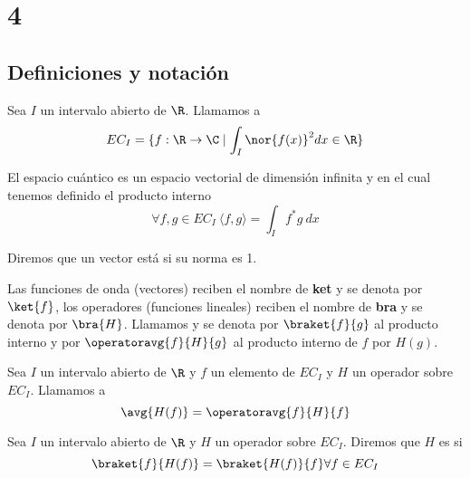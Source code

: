 \chapter{4}\label{ch:4}
\section{Definiciones y notación}
\begin{definition}
    Sea $I$ un intervalo abierto de $\R$. Llamamos  a
    \begin{equation}
        EC_I=\{f:\R\rightarrow\C\mid\int_I\nor{f(x)}^2 dx \in \R\}
    \end{equation}
\end{definition}

El espacio cuántico es un espacio vectorial de dimensión infinita y en el cual tenemos definido el producto interno
\begin{equation}
    \forall f,g\in EC_I \ \langle f,g \rangle=\int_I f^* g\ dx
\end{equation}

\begin{definition}
    Diremos que un vector está  si su norma es 1.
\end{definition}

Las funciones de onda (vectores) reciben el nombre de \textbf{ket} y se denota por $\ket{f}$, los operadores (funciones lineales) reciben el nombre de \textbf{bra} y se denota por $\bra{H}$. Llamamos  y se denota por $\braket{f}{g}$ al producto interno y por $\operatoravg{f}{H}{g}$ al producto interno de $f$ por $H(g)$.

\begin{definition}
    Sea $I$ un intervalo abierto de $\R$ y $f$ un elemento de $EC_I$ y $H$ un operador sobre $EC_I$. Llamamos  a
    \begin{equation}
        \avg{H(f)}=\operatoravg{f}{H}{f}
    \end{equation}
\end{definition}


\begin{definition}
    Sea $I$ un intervalo abierto de $\R$ y $H$ un operador sobre $EC_I$. Diremos que $H$ es  si
    \begin{equation}
        \braket{f}{H(f)}=\braket{H(f)}{f}\forall f\in EC_I
    \end{equation}
\end{definition}